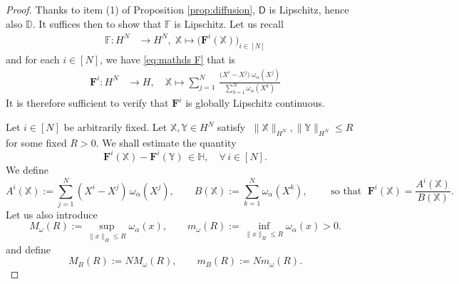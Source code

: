 \documentclass[12pt]{amsart}
\numberwithin{equation}{section}
\begin{document}
\begin{proof}
Thanks to item (1) of Proposition \ref{prop:diffusion}, $\mathsf{D}$ is Lipschitz, hence also $\mathbb{D}$. It suffices then to show that $\mathds{F}$ is Lipschitz. 
Let us recall 
\begin{equation*}
\begin{aligned}
    \mathds{F}: H^N & \longrightarrow H^N,\;
        \mathds{X}  \longmapsto \big( \mathbf{F}^{i}(\mathds{X}) \big)_{i\in [N]} %
\end{aligned}
\end{equation*}
and for each $i\in [N]$, we have \eqref{eq:mathds F} that is
\begin{equation*}
\begin{aligned}
    \mathbf{F}^{i}: H^N & \longrightarrow H,\quad
        \mathds{X}  \longmapsto \sum\limits_{j=1}^{N}\,\frac{\big(X^{i}-X^{j}\big)\; \omega_{\alpha}(X^{j})}{\sum\limits_{k=1}^{N}\omega_{\alpha}(X^{k})}
\end{aligned}
\end{equation*}
It is therefore sufficient to verify that $\mathbf{F}^i$ is globally Lipschitz continuous. 



Let $i\in[N]$ be arbitrarily fixed. 
Let $\mathds{X}, \mathds{Y} \in H^N$ satisfy $\;\|\mathds{X}\|_{H^N}, \|\mathds{Y}\|_{H^N} \le R\;$
for some fixed $R>0$. 
We shall estimate the quantity 
\begin{equation*}
    \mathbf{F}^{i}(\mathds{X}) - \mathbf{F}^{i}(\mathds{Y}) \, \in \mathbb{H},\quad \forall\, i\in [N].
\end{equation*}
We define
\begin{equation*}
    A^i(\mathds{X}) := \sum_{j=1}^N (X^i - X^j)\,\omega_\alpha(X^j), \qquad B(\mathds{X}) := \sum_{k=1}^N \omega_\alpha(X^k), \qquad \text{ so that } \; \mathbf{F}^i(\mathds{X}) = \frac{A^i(\mathds{X})}{B(\mathds{X})}.
\end{equation*}
Let us also introduce
\begin{equation*}
    M_\omega(R) := \sup_{\|x\|_H \le R} \omega_\alpha(x), \qquad m_\omega(R) := \inf_{\|x\|_H \le R} \omega_\alpha(x) > 0.
\end{equation*}
and define
\begin{equation*}
    M_B(R) := N M_\omega(R), \qquad m_B(R) := N m_\omega(R).
\end{equation*}


\end{proof}
\end{document}
